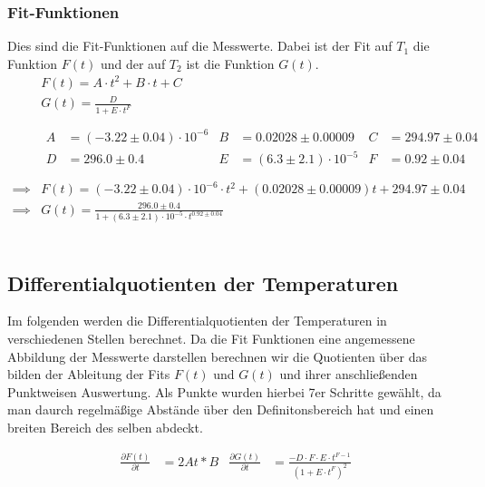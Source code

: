 \subsubsection{Fit-Funktionen}
Dies sind die Fit-Funktionen auf die Messwerte. Dabei ist der Fit auf $T_1$ die Funktion $F(t)$ und der auf $T_2$ ist die Funktion $G(t)$.
\begin{align}
    &F(t) =A \cdot t^2+B \cdot t+ C \\
    &G(t) = \frac{D}{1+E \cdot t^{F}}\\ 
    \nonumber
    \\
    &\begin{aligned}
        A &=(-3.22\pm 0.04)\cdot 10^{-6} & B&=0.02028\pm 0.00009 & C&=294.97\pm 0.04 \\
        D &=296.0\pm 0.4 & E&= (6.3\pm 2.1)\cdot 10^{-5}& F&=0.92\pm 0.04
    \end{aligned}\\
    \nonumber
    \\
    \implies &F(t) =(-3.22\pm 0.04)\cdot 10^{-6}\cdot t^2+(0.02028\pm 0.00009)t+294.97\pm 0.04 \\
    \implies &G(t) = \frac{296.0\pm 0.4}{1+(6.3\pm 2.1)\cdot 10^{-5}\cdot t^{0.92\pm 0.04}}
\end{align}
\\
\subsection{Differentialquotienten der Temperaturen}
Im folgenden werden die Differentialquotienten der Temperaturen in verschiedenen Stellen berechnet.
Da die Fit Funktionen eine angemessene Abbildung der Messwerte darstellen berechnen wir die Quotienten über das bilden der Ableitung der Fits $F(t)$ und $G(t)$ 
und ihrer anschließenden Punktweisen Auswertung.
Als Punkte wurden hierbei 7er Schritte gewählt, da man daurch regelmäßige Abstände über den Definitonsbereich hat und einen breiten Bereich des selben abdeckt.


\begin{align}
    \frac{\partial F(t)}{\partial t} &=2At*B & \frac{\partial G(t)}{\partial t} &= \frac{-D \cdot F\cdot E \cdot t^{F-1}}{(1+E\cdot t^{F})^{2}}
\end{align}

